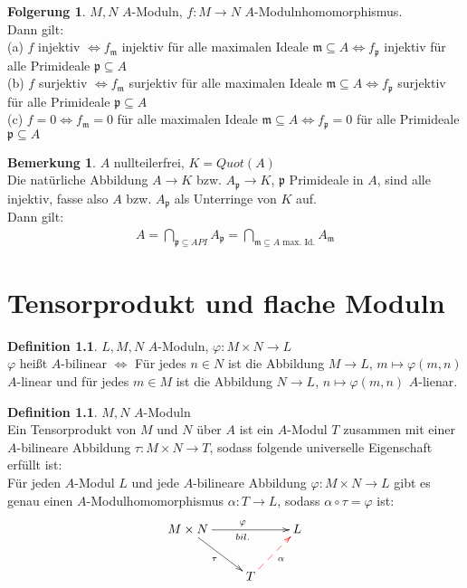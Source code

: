 \documentclass[10pt,a4paper,numbers=endperiod]{scrreprt}
\theoremstyle{definition}
\newtheorem{defi}[satz]{Definition}
\newtheorem{bem}[satz]{Bemerkung}
\newtheorem{folg}[satz]{Folgerung}
\begin{document}
\begin{folg}
	$M, N$ $A$-Moduln, $f: M \to N$ $A$-Modulnhomomorphismus.\\
	Dann gilt:\\
	(a) $f$ injektiv $\Leftrightarrow f_{\mathfrak{m}}$ injektiv für alle maximalen Ideale $\mathfrak{m} \subseteq A \Leftrightarrow f_\mathfrak{p}$ injektiv für alle Primideale $\mathfrak{p} \subseteq A$\\
	(b) $f$ surjektiv $\Leftrightarrow f_\mathfrak{m}$ surjektiv für alle maximalen Ideale $\mathfrak{m} \subseteq A \Leftrightarrow f_{\mathfrak{p}}$ surjektiv für alle Primideale $\mathfrak{p} \subseteq A$\\
	(c) $f = 0 \Leftrightarrow f_{\mathfrak{m}} = 0$ für alle maximalen Ideale $\mathfrak{m} \subseteq A \Leftrightarrow f_{\mathfrak{p}} = 0$ für alle Primideale $\mathfrak{p} \subseteq A$
\end{folg}

\begin{bem}
	$A$ nullteilerfrei, $K = Quot(A)$\\
	Die natürliche Abbildung $A \to K$ bzw. $A_\mathfrak{p} \to K$, $\mathfrak{p}$ Primideale in $A$, sind alle injektiv, fasse also $A$ bzw. $A_\mathfrak{p}$ als Unterringe von $K$ auf.\\
	Dann gilt: \begin{align*}
		A = \bigcap\limits_{\mathfrak{p} \subseteq A PI} A_\mathfrak{p} = \bigcap\limits_{\mathfrak{m} \subseteq A \text{ max. Id.}} A_\mathfrak{m}
	\end{align*}
\end{bem}

\chapter{Tensorprodukt und flache Moduln} 

\begin{defi}
	$L, M, N$ $A$-Moduln, $\varphi: M \times N \to L$\\
	$\varphi$ heißt $A$-bilinear $\Leftrightarrow$ Für jedes $n \in N$ ist die Abbildung $M \to L$, $m \mapsto \varphi(m, n)$ $A$-linear und für jedes $m \in M$ ist die Abbildung $N \to L$, $n \mapsto \varphi(m, n)$ $A$-lienar.
\end{defi}

\begin{defi}
	$M, N$ $A$-Moduln\\
	Ein Tensorprodukt von $M$ und $N$ über $A$ ist ein $A$-Modul $T$ zusammen mit einer $A$-bilineare Abbildung $\tau: M \times N \to T$, sodass folgende universelle Eigenschaft erfüllt ist:\\
	Für jeden $A$-Modul $L$ und jede $A$-bilineare Abbildung $\varphi: M \times N \to L$ gibt es genau einen $A$-Modulhomomorphismus $\alpha: T \to L$, sodass $\alpha \circ \tau = \varphi$ ist: \begin{align*}
		\begin{xy}
		\xymatrix{
			M \times N \ar[rr]_{bil.}^{\varphi} \ar[dr]_{\tau}   & &  L\\
			& T \ar@[red]@{-->}[ur]_\alpha
		}
		\end{xy}
	\end{align*}
\end{defi}
\end{document}
